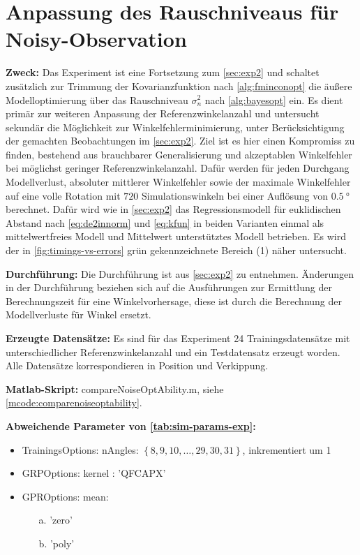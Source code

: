 %

\section{Anpassung des Rauschniveaus für Noisy-Observation}\label{sec:exp3}


\textbf{Zweck:} Das Experiment ist eine Fortsetzung zum \autoref{sec:exp2} und schaltet zusätzlich zur Trimmung der Kovarianzfunktion nach \autoref{alg:fminconopt} die äußere Modelloptimierung über das Rauschniveau $\sigma_n^2$ nach \autoref{alg:bayesopt} ein. Es dient primär zur weiteren Anpassung der Referenzwinkelanzahl und untersucht sekundär die Möglichkeit zur Winkelfehlerminimierung, unter Berücksichtigung der gemachten Beobachtungen im \autoref{sec:exp2}. Ziel ist es hier einen Kompromiss zu finden, bestehend aus brauchbarer Generalisierung und akzeptablen Winkelfehler bei möglichst geringer Referenzwinkelanzahl. Dafür werden für jeden Durchgang Modellverlust, absoluter mittlerer Winkelfehler sowie der maximale Winkelfehler auf eine volle Rotation mit $720$ Simulationswinkeln bei einer Auflösung von $\SI{0,5}{\degree}$ berechnet. Dafür wird wie in \autoref{sec:exp2} das Regressionsmodell für euklidischen Abstand nach \autoref{eq:de2innorm} und \autoref{eq:kfun} in beiden Varianten einmal als mittelwertfreies Modell und Mittelwert unterstütztes Modell betrieben. Es wird der in \autoref{fig:timings-vs-errors} grün gekennzeichnete Bereich (1) näher untersucht.

\textbf{Durchführung:} Die Durchführung ist aus \autoref{sec:exp2} zu entnehmen. Änderungen in der Durchführung beziehen sich auf die Ausführungen zur Ermittlung der Berechnungszeit für eine Winkelvorhersage, diese ist durch die Berechnung der Modellverluste für Winkel ersetzt.

\textbf{Erzeugte Datensätze:} Es sind für das Experiment 24 Trainingsdatensätze mit unterschiedlicher Referenzwinkelanzahl und ein Testdatensatz erzeugt worden. Alle Datensätze korrespondieren in Position und Verkippung.

\textbf{Matlab-Skript:} compareNoiseOptAbility.m, siehe \autoref{mcode:comparenoiseoptability}.

\textbf{Abweichende Parameter von \autoref{tab:sim-params-exp}:}

\begin{itemize}
	\item TrainingsOptions: nAngles: $\left\{ 8, 9, 10, \ldots, 29, 30, 31 \right\}$, inkrementiert um 1
	\item GRPOptions: kernel : 'QFCAPX'
	\item GPROptions: mean: 
	\begin{itemize}
		\item[a.] 'zero'
		\item[b.] 'poly'
	\end{itemize}
\end{itemize}



